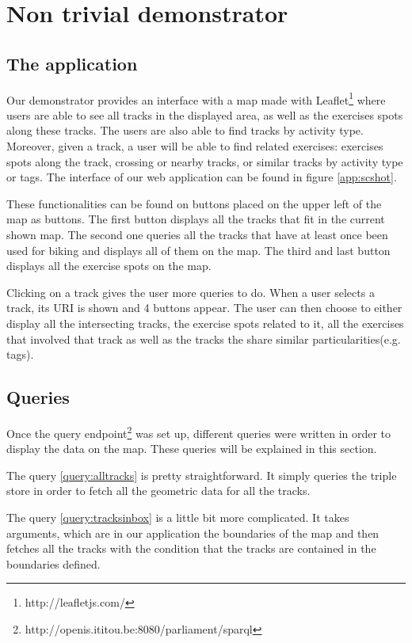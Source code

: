 \documentclass[11pt,a4paper]{scrreprt}
\begin{document}
\chapter{Non trivial demonstrator}
\section{The application}
Our demonstrator provides an interface with a map made with Leaflet\footnote{http://leafletjs.com/} where users are able to see all tracks in the displayed area, as well as the exercises spots along these tracks. The users are also able to find tracks by activity type. Moreover, given a track, a user will be able to find related exercises: exercises spots along the track, crossing or nearby tracks, or similar tracks by activity type or tags. The interface of our web application can be found in figure \ref{app:scshot}.

These functionalities can be found on buttons placed on the upper left of the map as buttons. The first button displays all the tracks that fit in the current shown map. The second one queries all the tracks that have at least once been used for biking and displays all of them on the map. The third and last button displays all the exercise spots on the map.

Clicking on a track gives the user more queries to do. When a user selects a track, its URI is shown and 4 buttons appear. The user can then choose to either display all the intersecting tracks, the exercise spots related to it, all the exercises that involved that track as well as the tracks the share similar particularities(e.g. tags). 

\section{Queries}
Once the query endpoint\footnote{http://openis.ititou.be:8080/parliament/sparql} was set up, different queries were written in order to display the data on the map. These queries will be explained in this section. 

The query \ref{query:alltracks} is pretty straightforward. It simply queries the triple store in order to fetch all the geometric data for all the tracks.

The query \ref{query:tracksinbox} is a little bit more complicated. It takes arguments, which are in our application the boundaries of the map and then fetches all the tracks with the condition that the tracks are contained in the boundaries defined.
\end{document}
